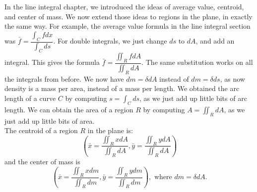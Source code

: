 \vskip0.1cm

In the line integral chapter, we introduced the ideas of average value, centroid, and center of mass.  
We now extend those ideas to regions in the plane, in exactly the same way.  
For example, the average value formula in the line integral section was $\bar f = \dfrac{\int_C fdx}{\int_C ds}$. 
For double integrals, we just change $ds$ to $dA$, and add an integral.  
This gives the formula $\bar f = \dfrac{\iint_R fdA}{\iint_R dA}.$ 
The same substitution works on all the integrals from before.
We now have $dm = \delta dA$ instead of $dm=\delta ds$, as now density is a mass per area, instead of a mass per length. 
We obtained the arc length of a curve $C$ by computing $s=\int_C ds$, as we just add up little bits of arc length.  
We can obtain the area of a region $R$ by computing $A=\iint_R dA$, as we just add up little bits of area.\\

The centroid of a region $R$ in the plane is: 
$$
\left(\bar x = \frac{\iint_R x dA}{\iint_R dA}, 
\bar y = \frac{\iint_R y dA}{\iint_R dA}\right)
$$
and the center of mass is 
$$
\left(\bar x = \frac{\iint_R x  dm}{\iint_R dm}, 
\bar y = \frac{\iint_R y dm}{\iint_R dm}\right), \text{ where $dm=\delta dA$}.
$$





